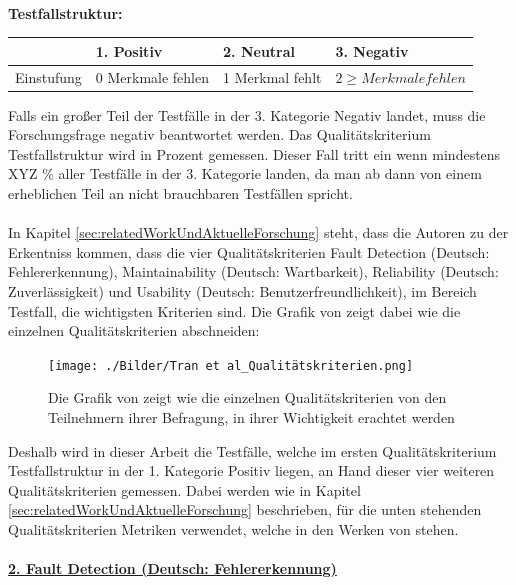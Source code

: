 \documentclass[12pt,toc=bib,toc=listof]{scrreprt}
\begin{document}
\\
\textbf{Testfallstruktur:}
\begin{table}[H]
\begin{tabular}{|l|l|l|l|}
\hline
               & 1. Positiv & 2. Neutral & 3. Negativ  \\ \hline
Einstufung  & 0 Merkmale fehlen       & 1 Merkmal fehlt        & $2 \geq Merkmale fehlen$        \\ \hline

\end{tabular}
\end{table}

\noindent Falls ein großer Teil der Testfälle in der 3. Kategorie Negativ landet, muss die Forschungsfrage negativ beantwortet werden. Das Qualitätskriterium Testfallstruktur wird in Prozent gemessen. Dieser Fall tritt ein wenn mindestens XYZ \% aller Testfälle in der 3. Kategorie landen, da man ab dann von einem erheblichen Teil an nicht brauchbaren Testfällen spricht.\\
\\
In Kapitel \ref{sec:relatedWorkUndAktuelleForschung} steht, dass die Autoren \textcite{Tran2025} zu der Erkentniss kommen, dass die vier Qualitätskriterien 
Fault Detection (Deutsch: Fehlererkennung), Maintainability (Deutsch: Wartbarkeit), Reliability (Deutsch: Zuverlässigkeit) und Usability (Deutsch: Benutzerfreundlichkeit), im Bereich Testfall, die wichtigsten Kriterien sind.
Die Grafik von \textcite{Tran2025} zeigt dabei wie die einzelnen Qualitätskriterien abschneiden:
\begin{figure} [H]
    \centering
    \texttt{[image: ./Bilder/Tran et al\_Qualitätskriterien.png]}
    \caption{Die Grafik von \textcite{Tran2025} zeigt wie die einzelnen Qualitätskriterien von den Teilnehmern ihrer Befragung, in ihrer Wichtigkeit erachtet werden}
    \label{fig:enter-label}
\end{figure}
\noindent Deshalb wird in dieser Arbeit die Testfälle, welche im ersten Qualitätskriterium Testfallstruktur in der 1. Kategorie Positiv liegen, an Hand dieser vier weiteren Qualitätskriterien gemessen. Dabei werden wie in Kapitel \ref{sec:relatedWorkUndAktuelleForschung} beschrieben, für die unten stehenden Qualitätskriterien Metriken verwendet, welche in den Werken von \parencite{Nirpals2011, Lazić2013} stehen.\\
\\\textbf{\underline{2. Fault Detection (Deutsch: Fehlererkennung)}}\\
\\
\end{document}
